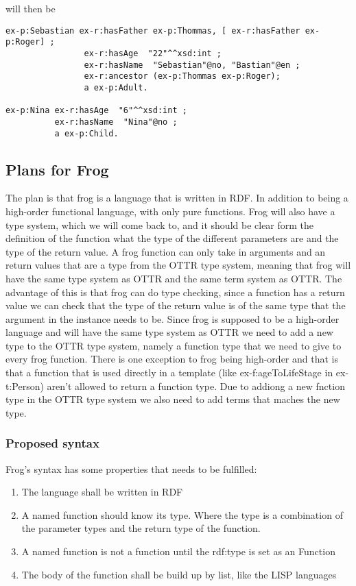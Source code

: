will then be
\begin{lstlisting}[frame=single, language=turtle]
ex-p:Sebastian ex-r:hasFather ex-p:Thommas, [ ex-r:hasFather ex-p:Roger] ; 
                ex-r:hasAge  "22"^^xsd:int ; 
                ex-r:hasName  "Sebastian"@no, "Bastian"@en ;
                ex-r:ancestor (ex-p:Thommas ex-p:Roger);
                a ex-p:Adult.

ex-p:Nina ex-r:hasAge  "6"^^xsd:int ; 
          ex-r:hasName  "Nina"@no ;
          a ex-p:Child.
\end{lstlisting}

\subsection{Plans for Frog}
The plan is that frog is a language that is written in RDF. In addition to being a high-order functional language, 
with only pure functions. 
Frog will also have a type system, which we will come back to, and it should be clear form the definition of 
the function what the type of the different parameters are and the type of the return value. 
A frog function can only take in arguments and an return values that are a type from the OTTR type system, 
meaning that frog will have the same type system as OTTR and the same term system as OTTR.
The advantage of this is that frog can do type checking, since a function has a return value we can check that 
the type of the return value is of the same type that the argument in the instance needs to be.
Since frog is supposed to be a high-order language and will have the same type system as OTTR  
we need to add a new type to the OTTR type system, namely a function type that we need to give to every frog function. 
There is one exception to frog being high-order and that is that a function that is used directly in a 
template (like ex-f:ageToLifeStage in ex-t:Person) aren't allowed to return a function type. Due to addiong a new 
fnction type in the OTTR type system we also need to add terms that maches the new type. 

\subsubsection{Proposed syntax}
Frog's syntax has some properties that needs to be fulfilled: 
\begin{enumerate}
    \item The language shall be written in RDF 
    \item A named function should know its type. Where the type is a combination of the parameter types 
    and the return type of the function.
    \item A named function is not a function until the rdf:type is set as an Function
    \item The body of the function shall be build up by list, like the LISP languages
\end{enumerate}



